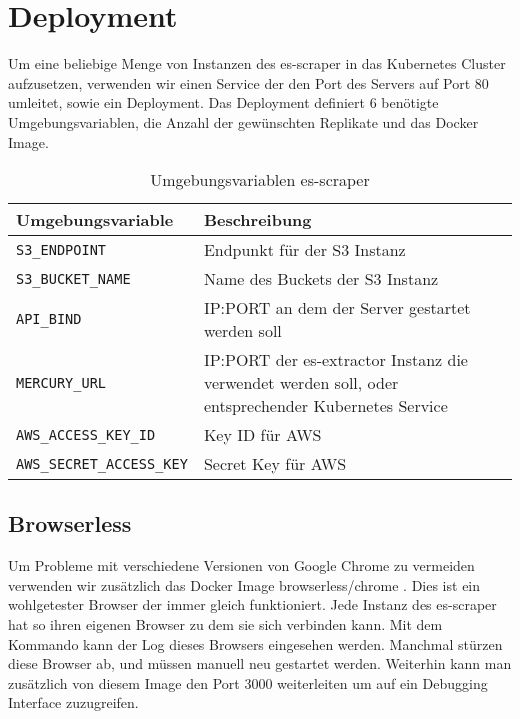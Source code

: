 \section{Deployment} \label{scraper:sec:deployment}
Um eine beliebige Menge von Instanzen des es-scraper in das Kubernetes Cluster aufzusetzen, verwenden wir einen Service der den Port des Servers auf Port 80 umleitet, sowie ein Deployment. Das Deployment definiert 6 benötigte Umgebungsvariablen, die Anzahl der gewünschten Replikate und das Docker Image. \\
\begin{table}[h]
\centering
\begin{tabu}{lX}
	\toprule
	Umgebungsvariable & Beschreibung \\ \midrule
	\texttt{S3\_ENDPOINT}& Endpunkt für der S3 Instanz\\
	\texttt{S3\_BUCKET\_NAME}& Name des Buckets der S3 Instanz\\
	\texttt{API\_BIND}& IP:PORT an dem der Server gestartet werden soll\\
	\texttt{MERCURY\_URL}& IP:PORT der es-extractor Instanz die verwendet werden soll, oder entsprechender Kubernetes Service\\
	\texttt{AWS\_ACCESS\_KEY\_ID} & Key ID für AWS\\
	\texttt{AWS\_SECRET\_ACCESS\_KEY} & Secret Key für AWS\\ \bottomrule
\end{tabu}
\caption{Umgebungsvariablen es-scraper}
\end{table}

\subsection*{Browserless}
Um Probleme mit verschiedene Versionen von Google Chrome zu vermeiden verwenden wir zusätzlich das Docker Image browserless/chrome \cite{https://www.browserless.io/}. Dies ist ein wohlgetester Browser der immer gleich funktioniert. Jede Instanz des es-scraper hat so ihren eigenen Browser zu dem sie sich verbinden kann. Mit dem Kommando 
kann der Log dieses Browsers eingesehen werden. Manchmal stürzen diese Browser ab, und müssen manuell neu gestartet werden. Weiterhin kann man zusätzlich von diesem Image den Port 3000 weiterleiten um auf ein Debugging Interface zuzugreifen.